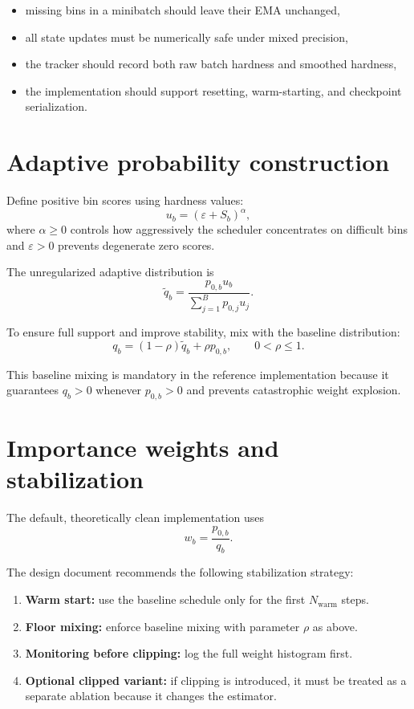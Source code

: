 \documentclass[11pt]{report}
\begin{document}
\begin{itemize}[leftmargin=2em]
    \item missing bins in a minibatch should leave their EMA unchanged,
    \item all state updates must be numerically safe under mixed precision,
    \item the tracker should record both raw batch hardness and smoothed hardness,
    \item the implementation should support resetting, warm-starting, and checkpoint serialization.
\end{itemize}

\section{Adaptive probability construction}

Define positive bin scores using hardness values:
\[
u_b = (\varepsilon + S_b)^\alpha,
\]
where $\alpha \ge 0$ controls how aggressively the scheduler concentrates on difficult bins and $\varepsilon > 0$ prevents degenerate zero scores.

The unregularized adaptive distribution is
\[
\tilde{q}_b = \frac{p_{0,b} u_b}{\sum_{j=1}^{B} p_{0,j}u_j}.
\]

To ensure full support and improve stability, mix with the baseline distribution:
\[
q_b = (1-\rho)\tilde{q}_b + \rho p_{0,b}, \qquad 0 < \rho \le 1.
\]

This baseline mixing is mandatory in the reference implementation because it guarantees $q_b > 0$ whenever $p_{0,b} > 0$ and prevents catastrophic weight explosion.

\section{Importance weights and stabilization}

The default, theoretically clean implementation uses
\[
w_b = \frac{p_{0,b}}{q_b}.
\]

The design document recommends the following stabilization strategy:

\begin{enumerate}[leftmargin=2em]
    \item \textbf{Warm start:} use the baseline schedule only for the first $N_{\text{warm}}$ steps.
    \item \textbf{Floor mixing:} enforce baseline mixing with parameter $\rho$ as above.
    \item \textbf{Monitoring before clipping:} log the full weight histogram first.
    \item \textbf{Optional clipped variant:} if clipping is introduced, it must be treated as a separate ablation because it changes the estimator.
\end{enumerate}
\end{document}
